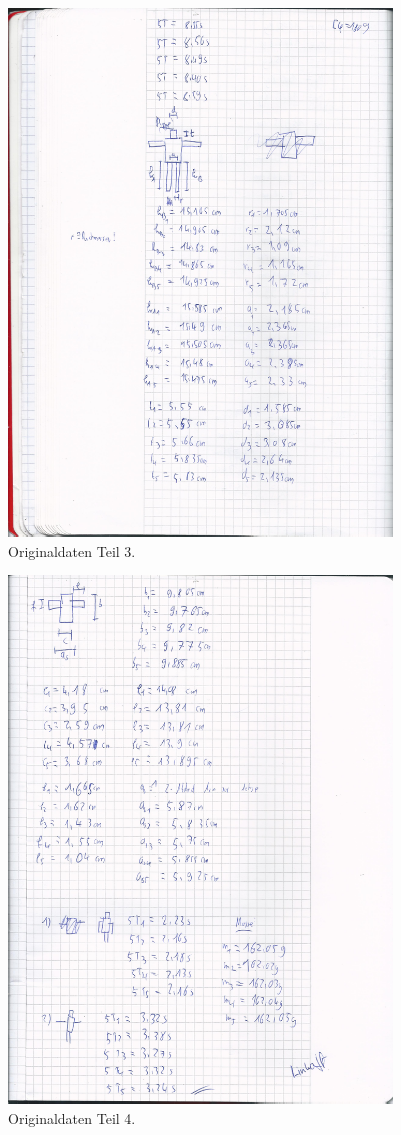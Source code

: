 \begin{figure}[H]
  \centering
  \includegraphics[height=14cm]{original3.jpg}
  \caption{Originaldaten Teil 3.}
  \label{fig:original3}
\end{figure}

\begin{figure}[H]
  \centering
  \includegraphics[height=14cm]{original4.jpg}
  \caption{Originaldaten Teil 4.}
  \label{fig:original4}
\end{figure}

\printbibliography


